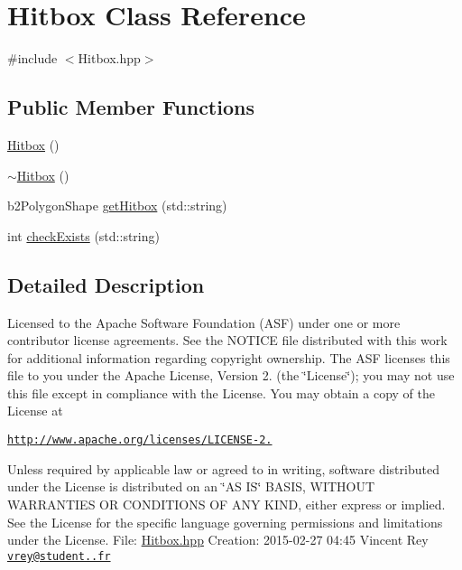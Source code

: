 \hypertarget{class_hitbox}{\section{Hitbox Class Reference}
\label{class_hitbox}
}


{\ttfamily \#include $<$Hitbox.\-hpp$>$}

\subsection*{Public Member Functions}
\begin{DoxyCompactItemize}
\item 
\hyperlink{class_hitbox_a999b0be8486978b3dd7bcd001c7c3c03}{Hitbox} ()
\item 
\hyperlink{class_hitbox_aafd01dbe871f6f7f464217345bd4ca01}{$\sim$\-Hitbox} ()
\item 
b2\-Polygon\-Shape \hyperlink{class_hitbox_a2f5b5e9940cc0918e58dfbfb62a493bb}{get\-Hitbox} (std\-::string)
\item 
int \hyperlink{class_hitbox_ae1b89c84071782c72ee6feb56c109c59}{check\-Exists} (std\-::string)
\end{DoxyCompactItemize}


\subsection{Detailed Description}
Licensed to the Apache Software Foundation (A\-S\-F) under one or more contributor license agreements. See the N\-O\-T\-I\-C\-E file distributed with this work for additional information regarding copyright ownership. The A\-S\-F licenses this file to you under the Apache License, Version 2. (the \char`\"{}\-License\char`\"{}); you may not use this file except in compliance with the License. You may obtain a copy of the License at

\href{http://www.apache.org/licenses/LICENSE-2.0}{\tt http\-://www.\-apache.\-org/licenses/\-L\-I\-C\-E\-N\-S\-E-\/2.}

Unless required by applicable law or agreed to in writing, software distributed under the License is distributed on an \char`\"{}\-A\-S I\-S\char`\"{} B\-A\-S\-I\-S, W\-I\-T\-H\-O\-U\-T W\-A\-R\-R\-A\-N\-T\-I\-E\-S O\-R C\-O\-N\-D\-I\-T\-I\-O\-N\-S O\-F A\-N\-Y K\-I\-N\-D, either express or implied. See the License for the specific language governing permissions and limitations under the License. File\-: \hyperlink{_hitbox_8hpp}{Hitbox.\-hpp} Creation\-: 2015-\/02-\/27 04\-:45 Vincent Rey \href{mailto:vrey@student.42.fr}{\tt vrey@student..\-fr} 

